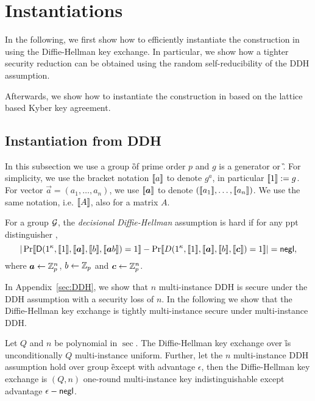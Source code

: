 \section{Instantiations}\label{sec:inst}
In the following, we first show how to efficiently instantiate the construction in  using the Diffie-Hellman key exchange. In particular, we show how a tighter security reduction can be obtained using the random self-reducibility of the DDH assumption.

Afterwards, we show how to instantiate the construction in  based on the lattice based Kyber key agreement. 


\subsection{Instantiation from DDH}

In this subsection we use a group \G of prime order $p$ and $g$ is a generator or \G. For simplicity, we use the bracket notation $\llbracket a\rrbracket$ to denote $g^a$, in particular $\llbracket 1\rrbracket:=g$. For vector $\vec{a}=(a_1,\ldots,a_n)$, we use $\lb \vec{a}\rb$ to denote $(\llbracket a_1\rrbracket,\ldots,\llbracket a_n\rrbracket)$. We use the same notation, i.e. $\llbracket A\rrbracket$, also for a matrix $A$.



\begin{definition}
For a group $\mathcal{G}$, the \emph{decisional Diffie-Hellman} assumption is hard if for any ppt distinguisher \D,
$$
|\Pr\lb \D(1^\sec,\lb 1\rb,\lb \vec{a}\rb,\lb b\rb,\lb \vec{a}b\rb)=1\rb-\Pr\lb D(1^\sec,\lb 1\rb,\lb \vec{a}\rb,\lb b\rb,\lb \vec{c}\rb)=1\rb|=\negl,
$$
where $\vec{a}\leftarrow\Z_p^n$, $b\leftarrow\mathbb Z_p$ and $\vec{c}\leftarrow\Z_p^n$.
\end{definition}

In Appendix~\ref{sec:DDH}, we show that $n$ multi-instance DDH is secure under the DDH assumption with a security loss of $n$. In the following we show that the Diffie-Hellman key exchange is tightly multi-instance secure under multi-instance DDH. 

\begin{lemma}\label{lem:DDH}
Let $Q$ and $n$ be polynomial in $\sec$.
The Diffie-Hellman key exchange over \G is unconditionally $Q$ multi-instance uniform. Further, let the $n$ multi-instance DDH assumption hold over group \G except with advantage $\epsilon$, then the Diffie-Hellman key exchange is $(Q,n)$ one-round multi-instance key indistinguishable except advantage $\epsilon-\mathsf{negl}$. 
\end{lemma}

